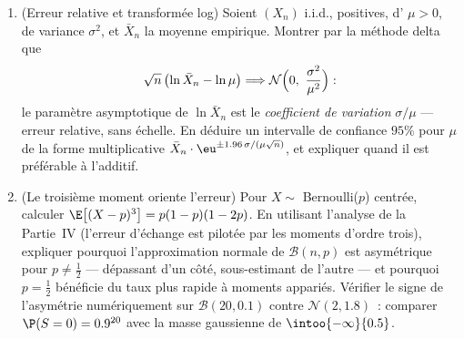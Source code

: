 \begin{problem}
\begin{enumerate}[resume]
  \item (Erreur relative et transformée log) Soient
        $(X_n)$ i.i.d., positives, d' $\mu > 0$,
        de variance $\sigma^2$, et $\bar X_n$ la moyenne
        empirique. Montrer par la méthode delta que
        \[
        \sqrt n\,\bigl(\ln\bar X_n - \ln\mu\bigr)
        \Longrightarrow
        \mathcal N\Bigl(0,\ \frac{\sigma^2}{\mu^2}\Bigr) :
        \]
        le paramètre asymptotique de $\ln\bar X_n$ est le
        \emph{coefficient de variation} $\sigma/\mu$ ---
        erreur relative, sans échelle. En déduire un
        intervalle de confiance $95\%$ pour $\mu$ de la
        forme multiplicative $\bar
        X_n\cdot\eu^{\pm1.96\,\sigma/(\mu\sqrt n)}$, et
        expliquer quand il est préférable à l'additif.
  \item (Le troisième moment oriente l'erreur) Pour $X
        \sim$ Bernoulli($p$) centrée, calculer
        $\E\bigl[(X - p)^3\bigr] = p(1-p)(1-2p)$. En
        utilisant l'analyse de la Partie~IV (l'erreur
        d'échange est pilotée par les moments d'ordre
        trois), expliquer pourquoi l'approximation normale
        de $\mathcal B(n, p)$ est asymétrique pour $p \neq
        \frac12$ --- dépassant d'un côté, sous-estimant de
        l'autre --- et pourquoi $p = \frac12$ bénéficie du
        taux plus rapide à moments appariés. Vérifier le
        signe de l'asymétrie numériquement sur $\mathcal
        B(20, 0.1)$ contre $\mathcal N(2, 1.8)$~: comparer
        $\P(S = 0) = 0.9^{20}$ avec la masse gaussienne de
        $\intoo{-\infty}{0.5}$.
\end{enumerate}
\end{problem}
